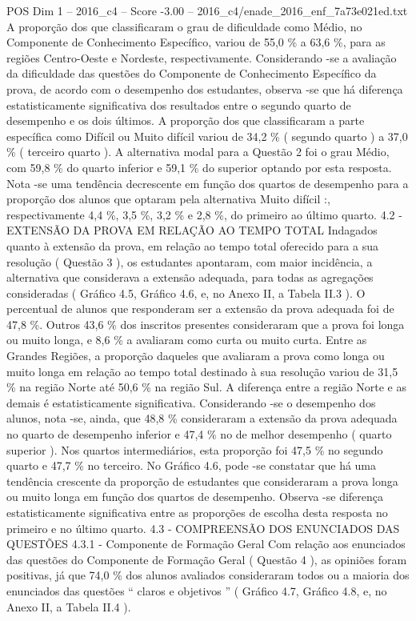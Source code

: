 \begin{textsample}{POS Dim 1 – 2016\_c4 – Score -3.00 – 2016\_c4/enade\_2016\_enf\_7a73e021ed.txt}
A proporção dos que classificaram o grau de dificuldade como Médio, no Componente de Conhecimento Específico, variou de 55,0 \% a 63,6 \%, para as regiões Centro-Oeste e Nordeste, respectivamente.
Considerando -se a avaliação da dificuldade das questões do Componente de Conhecimento Específico da prova, de acordo com o desempenho dos estudantes, observa -se que há diferença estatisticamente significativa dos resultados entre o segundo quarto de desempenho e os dois últimos.
A proporção dos que classificaram a parte específica como Difícil ou Muito difícil variou de 34,2 \% ( segundo quarto ) a 37,0 \% ( terceiro quarto ).
A alternativa modal para a Questão 2 foi o grau Médio, com 59,8 \% do quarto inferior e 59,1 \% do superior optando por esta resposta.
Nota -se uma tendência decrescente em função dos quartos de desempenho para a proporção dos alunos que optaram pela alternativa Muito difícil :, respectivamente 4,4 \%, 3,5 \%, 3,2 \% e 2,8 \%, do primeiro ao último quarto. 4.2 - EXTENSÃO DA PROVA EM RELAÇÃO AO TEMPO TOTAL Indagados quanto à extensão da prova, em relação ao tempo total oferecido para a sua resolução ( Questão 3 ), os estudantes apontaram, com maior incidência, a alternativa que considerava a extensão adequada, para todas as agregações consideradas ( Gráfico 4.5, Gráfico 4.6, e, no Anexo II, a Tabela II.3 ).
O percentual de alunos que responderam ser a extensão da prova adequada foi de 47,8 \%.
Outros 43,6 \% dos inscritos presentes consideraram que a prova foi longa ou muito longa, e 8,6 \% a avaliaram como curta ou muito curta.
Entre as Grandes Regiões, a proporção daqueles que avaliaram a prova como longa ou muito longa em relação ao tempo total destinado à sua resolução variou de 31,5 \% na região Norte até 50,6 \% na região Sul.
A diferença entre a região Norte e as demais é estatisticamente significativa.
Considerando -se o desempenho dos alunos, nota -se, ainda, que 48,8 \% consideraram a extensão da prova adequada no quarto de desempenho inferior e 47,4 \% no de melhor desempenho ( quarto superior ).
Nos quartos intermediários, esta proporção foi 47,5 \% no segundo quarto e 47,7 \% no terceiro.
No Gráfico 4.6, pode -se constatar que há uma tendência crescente da proporção de estudantes que consideraram a prova longa ou muito longa em função dos quartos de desempenho.
Observa -se diferença estatisticamente significativa entre as proporções de escolha desta resposta no primeiro e no último quarto. 4.3 - COMPREENSÃO DOS ENUNCIADOS DAS QUESTÕES 4.3.1 - Componente de Formação Geral Com relação aos enunciados das questões do Componente de Formação Geral ( Questão 4 ), as opiniões foram positivas, já que 74,0 \% dos alunos avaliados consideraram todos ou a maioria dos enunciados das questões “ claros e objetivos ” ( Gráfico 4.7, Gráfico 4.8, e, no Anexo II, a Tabela II.4 ).

\end{textsample}

